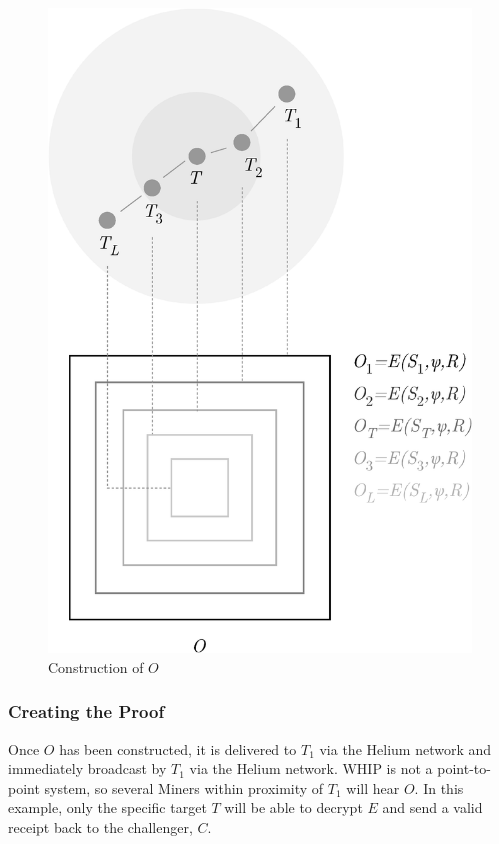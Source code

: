 \documentclass[10pt, nonatbib, nocopyrightspace, reprint]{sigplanconf}
\begin{document}
\begin{figure}[ht]
    \begin{center}
          \includegraphics[width=\columnwidth]{o_construction.eps}
          \caption{Construction of $O$}\label{fig:poc-o_construction}
     \end{center}
\end{figure}

\subsubsection{Creating the Proof}

Once $O$ has been constructed, it is delivered to $T_1$ via the Helium network and immediately broadcast by $T_1$ via the Helium network. WHIP is not a point-to-point system, so several Miners within proximity of $T_1$ will hear $O$. In this example, only the specific target $T$ will be able to decrypt $E$ and send a valid receipt back to the challenger, $C$.
\end{document}
